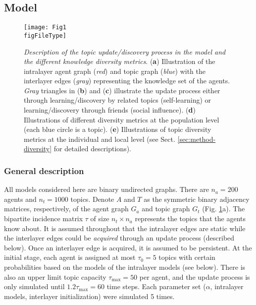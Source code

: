 \documentclass{svproc}
\def\figFileType{.eps}
\begin{document}
\subsection{Model} \label{sec:method-model}

\begin{figure}[!ht]
    \centering
    \texttt{[image: Fig1\\figFileType]}
    \caption{
    \textit{Description of the topic update/discovery process in the model and the different knowledge diversity metrics}.
    (\textbf{a}) Illustration of the intralayer agent graph (\textit{red}) and topic graph (\textit{blue}) with the interlayer edges (\textit{gray}) representing the knowledge set of the agents.
    \textit{Gray} triangles in (\textbf{b}) and (\textbf{c}) illustrate the update process either through learning/discovery by related topics (self-learning) or learning/discovery through friends (social influence).
    (\textbf{d}) Illustrations of different diversity metrics at the population level (each blue circle is a topic).
    (\textbf{e}) Illustrations of topic diversity metrics at the individual and local level (see Sect. \ref{sec:method-diversity} for detailed descriptions).
    }
    \label{fig:1}
\end{figure}

\subsubsection*{General description}

All models considered here are binary undirected graphs.
There are $n_a = 200$ agents and $n_t = 1000$ topics.
Denote $A$ and $T$ as the symmetric binary adjacency matrices, respectively, of the agent graph $G_a$ and topic graph $G_t$ (Fig. \ref{fig:1}a).
The bipartite incidence matrix $\tau$ of size $n_t \times n_a$ represents the topics that the agents know about.
It is assumed throughout that the intralayer edges are static while the interlayer edges could be \textit{acquired} through an update process (described below).
Once an interlayer edge is acquired, it is assumed to be persistent.
At the initial stage, each agent is assigned at most $\tau_0 = 5$ topics with certain probabilities based on the models of the intralayer models (see below).
There is also an upper limit topic capacity $\tau_{\mathrm{max}} = 50$ per agent, and the update process is only simulated until $1.2 \tau_{\mathrm{max}} = 60$ time steps.
Each parameter set ($\alpha$, intralayer models, interlayer initialization) were simulated 5 times.
\end{document}
